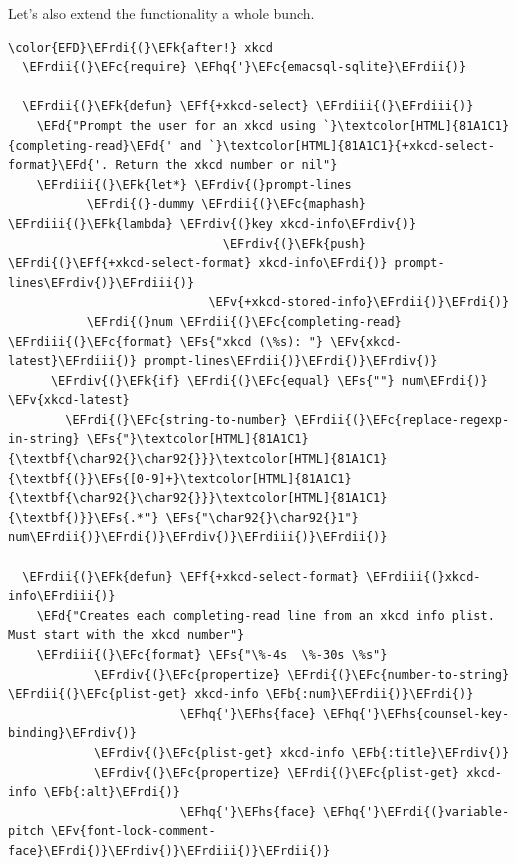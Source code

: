 \documentclass{scrartcl}
\newcommand{\EFk}[1]{\textcolor{EFk}{#1}} %
\newcommand{\EFd}[1]{\textcolor{EFd}{#1}} %
\newcommand{\EFs}[1]{\textcolor{EFs}{#1}} %
\newcommand{\EFb}[1]{\textcolor{EFb}{#1}} %
\newcommand{\EFc}[1]{\textcolor{EFc}{#1}} %
\newcommand{\EFv}[1]{\textcolor{EFv}{#1}} %
\newcommand{\EFf}[1]{\textcolor{EFf}{#1}} %
\newcommand{\EFhq}[1]{#1} %
\newcommand{\EFhs}[1]{#1} %
\newcommand{\EFrdi}[1]{#1} %
\newcommand{\EFrdii}[1]{#1} %
\newcommand{\EFrdiii}[1]{#1} %
\newcommand{\EFrdiv}[1]{#1} %
\begin{document}
Let's also extend the functionality a whole bunch.
\begin{Code}
\begin{Verbatim}[]
\color{EFD}\EFrdi{(}\EFk{after!} xkcd
  \EFrdii{(}\EFc{require} \EFhq{'}\EFc{emacsql-sqlite}\EFrdii{)}

  \EFrdii{(}\EFk{defun} \EFf{+xkcd-select} \EFrdiii{(}\EFrdiii{)}
    \EFd{"Prompt the user for an xkcd using `}\textcolor[HTML]{81A1C1}{completing-read}\EFd{' and `}\textcolor[HTML]{81A1C1}{+xkcd-select-format}\EFd{'. Return the xkcd number or nil"}
    \EFrdiii{(}\EFk{let*} \EFrdiv{(}prompt-lines
           \EFrdi{(}-dummy \EFrdii{(}\EFc{maphash} \EFrdiii{(}\EFk{lambda} \EFrdiv{(}key xkcd-info\EFrdiv{)}
                              \EFrdiv{(}\EFk{push} \EFrdi{(}\EFf{+xkcd-select-format} xkcd-info\EFrdi{)} prompt-lines\EFrdiv{)}\EFrdiii{)}
                            \EFv{+xkcd-stored-info}\EFrdii{)}\EFrdi{)}
           \EFrdi{(}num \EFrdii{(}\EFc{completing-read} \EFrdiii{(}\EFc{format} \EFs{"xkcd (\%s): "} \EFv{xkcd-latest}\EFrdiii{)} prompt-lines\EFrdii{)}\EFrdi{)}\EFrdiv{)}
      \EFrdiv{(}\EFk{if} \EFrdi{(}\EFc{equal} \EFs{""} num\EFrdi{)} \EFv{xkcd-latest}
        \EFrdi{(}\EFc{string-to-number} \EFrdii{(}\EFc{replace-regexp-in-string} \EFs{"}\textcolor[HTML]{81A1C1}{\textbf{\char92{}\char92{}}}\textcolor[HTML]{81A1C1}{\textbf{(}}\EFs{[0-9]+}\textcolor[HTML]{81A1C1}{\textbf{\char92{}\char92{}}}\textcolor[HTML]{81A1C1}{\textbf{)}}\EFs{.*"} \EFs{"\char92{}\char92{}1"} num\EFrdii{)}\EFrdi{)}\EFrdiv{)}\EFrdiii{)}\EFrdii{)}

  \EFrdii{(}\EFk{defun} \EFf{+xkcd-select-format} \EFrdiii{(}xkcd-info\EFrdiii{)}
    \EFd{"Creates each completing-read line from an xkcd info plist. Must start with the xkcd number"}
    \EFrdiii{(}\EFc{format} \EFs{"\%-4s  \%-30s \%s"}
            \EFrdiv{(}\EFc{propertize} \EFrdi{(}\EFc{number-to-string} \EFrdii{(}\EFc{plist-get} xkcd-info \EFb{:num}\EFrdii{)}\EFrdi{)}
                        \EFhq{'}\EFhs{face} \EFhq{'}\EFhs{counsel-key-binding}\EFrdiv{)}
            \EFrdiv{(}\EFc{plist-get} xkcd-info \EFb{:title}\EFrdiv{)}
            \EFrdiv{(}\EFc{propertize} \EFrdi{(}\EFc{plist-get} xkcd-info \EFb{:alt}\EFrdi{)}
                        \EFhq{'}\EFhs{face} \EFhq{'}\EFrdi{(}variable-pitch \EFv{font-lock-comment-face}\EFrdi{)}\EFrdiv{)}\EFrdiii{)}\EFrdii{)}


\end{Verbatim}
\end{Code}
\end{document}
